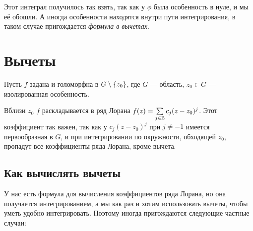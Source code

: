 \documentclass[a4paper]{report}
\begin{document}
    Этот интеграл получилось так взять, так как у $\phi$ была особенность в нуле, и мы её обошли.
    А иногда особенности находятся внутри пути интегрирования, в таком случае пригождается \emph{формула в вычетах}.
    \section{Вычеты}
    Пусть $f$ задана и голоморфна в $G \setminus \{z_0\}$, где $G$ --- область, $z_0 \in G$ --- изолированная особенность.

    Вблизи $z_0$ $f$ раскладывается в ряд Лорана $f(z) = \sum\limits_{j \in \mathbb{Z}}c_j (z - z_0)^j$.
    Этот коэффициент так важен, так как у $c_j (z - z_0)^j$ при $j \ne -1$ имеется первообразная в $G$, и при интегрировании по окружности, обходящей $z_0$, пропадут все коэффициенты ряда Лорана, кроме вычета.
    \subsection{Как вычислять вычеты}
    У нас есть формула для вычисления коэффициентов ряда Лорана, но она получается интегрированием, а мы как раз и хотим использовать вычеты, чтобы уметь удобно интегрировать.
    Поэтому иногда пригождаются следующие частные случаи:
\end{document}
